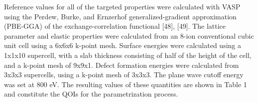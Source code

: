 Reference values for all of the targeted properties were calculated with VASP\cite{kresse1993_vasp,kresse1996_vasp1,kresse1996_vasp2} using the Perdew, Burke, and Ernzerhof generalized-gradient approximation (PBE-GGA) of the exchange-correlation functional [48], [49]. The lattice parameter and elastic properties were calculated from an 8-ion conventional cubic unit cell using a 6x6x6 k-point mesh.  Surface energies were calculated using a 1x1x10 supercell, with a slab thickness consisting of half of the height of the cell, and a k-point mesh of 9x9x1.  Defect formation energies were calculated from 3x3x3 supercells, using a k-point mesh of 3x3x3.  The plane wave cutoff energy was set at 800 eV. The resulting values of these quantities are shown in Table 1 and constitute the QOIs for the parametrization process.




